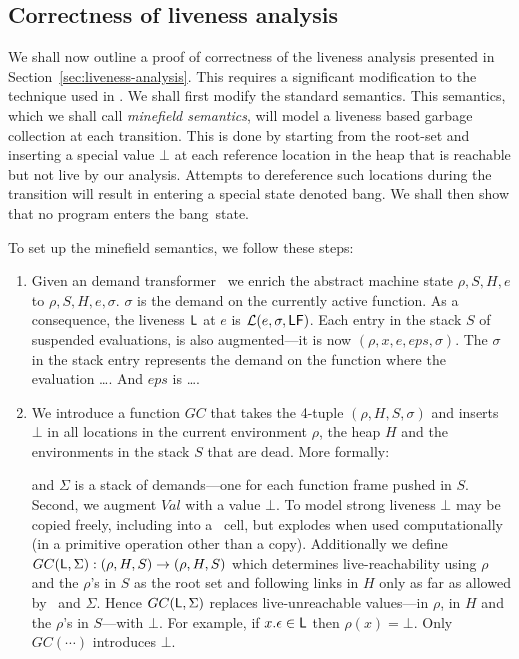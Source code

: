 \documentclass[9pt]{sigplanconf}
\newcommand{\bang}{\mbox{\sc bang}}
\begin{document}
{\color{red}
\subsection{Correctness of liveness analysis}  
 
We shall now  outline a proof of correctness  of the liveness analysis
presented  in  Section~\ref{sec:liveness-analysis}.   This requires  a
significant modification  to the technique  used in \cite{asati14lgc}.
We shall first modify the standard semantics. This semantics, which we
shall  call {\em  minefield semantics},  will model  a  liveness based
garbage collection at  each transition. This is done  by starting from
the root-set  and inserting a  special value $\bot$ at  each reference
location in the  heap that is reachable but not  live by our analysis.
Attempts  to dereference  such  locations during  the transition  will
result in entering a special  state denoted \bang.  We shall then show
that no program enters the \bang\ state.
 
To set up the minefield semantics, we follow these steps:
\begin{enumerate}
\item  Given an  demand transformer  \Lfonly\ we  enrich  the abstract
  machine state $\rho, S, H, e$  to $\rho, S, H, e, \sigma$.  $\sigma$
  is the  demand on the  currently active function. As  a consequence,
  the liveness $\mathsf{L}$ at $e$ is $\mathcal{L}(e, \sigma, \mathsf{LF})$. Each
  entry  in   the  stack  $S$   of  suspended  evaluations,   is  also
  augmented---it is  now $(\rho, x,  e, eps, \sigma)$. The $\sigma$  in the
  stack entry  represents the demand  on the  function where  the evaluation
  \ldots.  And $eps$ is \ldots.
\item We introduce a function $GC$ that takes the 4-tuple $(\rho, H, S,
  \sigma)$ and  inserts $\bot$ in all locations in the current
  environment $\rho$, the heap $H$ and the environments in the stack
  $S$ that are dead. More formally:





and $\Sigma$ is a  stack of demands---one for each function
  frame pushed in $S$.  Second,  we augment $Val$ with a value $\bot$.
  To model strong liveness $\bot$ may be copied freely, including into
  a  \CONS\  cell,  but  explodes  when  used  computationally  (in  a
  primitive operation  other than a copy). Additionally  we define $GC
  (\mathsf{L}, \Sigma)  : (\rho,  H, S) \rightarrow  (\rho ,  H , S  )$ which
  determines live-reachability using $\rho$ and the $\rho$'s in $S$ as
  the root  set and following links in  $H$ only as far  as allowed by
  \Lv\   and   $\Sigma$.     Hence   $GC   (\mathsf{L},   \Sigma)$   replaces
  live-unreachable  values---in $\rho$,  in  $H$ and  the $\rho$'s  in
  $S$---with $\bot$.  For example,  if $x.\epsilon \in \mathsf{L}$ then $\rho
  (x) = \bot$.  Only $GC (\cdots )$ introduces $\bot$.
\end{enumerate}  


 }
\end{document}
